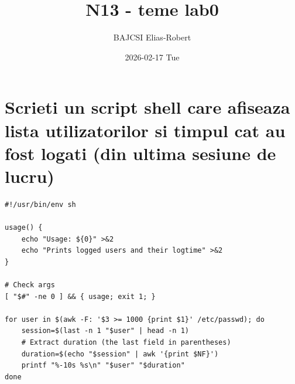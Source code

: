 \documentclass[11pt]{article}
\author{BAJCSI Elias-Robert}
\date{2026-02-17 Tue}
\title{N13 - teme lab0}
\begin{document}
\section{Scrieti un script shell care afiseaza lista utilizatorilor si timpul cat au fost logati (din ultima sesiune de lucru)}
\label{sec:orgc70b65e}
\begin{verbatim}
#!/usr/bin/env sh

usage() {
    echo "Usage: ${0}" >&2
    echo "Prints logged users and their logtime" >&2
}

# Check args
[ "$#" -ne 0 ] && { usage; exit 1; }

for user in $(awk -F: '$3 >= 1000 {print $1}' /etc/passwd); do
    session=$(last -n 1 "$user" | head -n 1)
    # Extract duration (the last field in parentheses)
    duration=$(echo "$session" | awk '{print $NF}')
    printf "%-10s %s\n" "$user" "$duration"
done
\end{verbatim}
\end{document}
